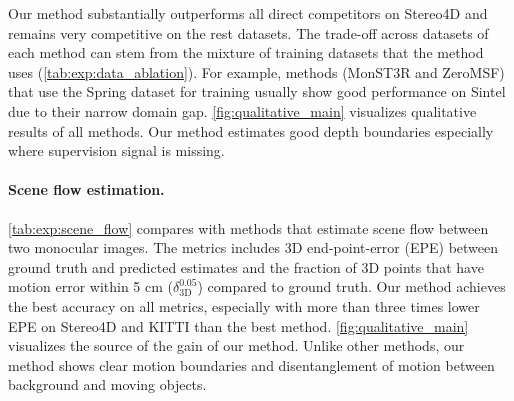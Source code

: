 Our method substantially outperforms all direct competitors on Stereo4D and remains very competitive on the rest datasets.
The trade-off across datasets of each method can stem from the mixture of training datasets that the method uses (\cf \cref{tab:exp:data_ablation}).
For example, methods (\eg MonST3R and ZeroMSF) that use the Spring dataset for training usually show good performance on Sintel due to their narrow domain gap.
\cref{fig:qualitative_main} visualizes qualitative results of all methods. 
Our method estimates good depth boundaries especially where supervision signal is missing.

\paragraph{Scene flow estimation.}
\cref{tab:exp:scene_flow} compares with methods that estimate scene flow between two monocular images.
The metrics includes 3D end-point-error (EPE) between ground truth and predicted estimates and the fraction of 3D points that have motion error within 5 cm ($\delta^{0.05}_\text{3D}$) compared to ground truth.
Our method achieves the best accuracy on all metrics, especially with more than three times lower EPE on Stereo4D and KITTI than the best method.
\cref{fig:qualitative_main} visualizes the source of the gain of our method. Unlike other methods, our method shows clear motion boundaries and disentanglement of motion between background and moving objects.




